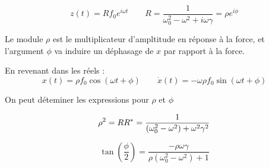 \begin{equation}
    z(t) = R f_0 e^{i \omega t} \qquad R = \frac{1}{\omega_0^2 - \omega^2 + i\omega\gamma} = \rho e^{i\phi}
\end{equation}

Le module $\rho$ est le multiplicateur d’ampltitude en réponse à la force, et l’argument $\phi$ va induire un déphasage de $x$ par rapport à la force.

En revenant dans les réels :
\begin{equation}
    x(t) = \rho f_0 \cos(\omega t + \phi)
    \qquad \dot{x}(t) = -\omega \rho f_0 \sin(\omega t + \phi)
\end{equation}

On peut déteminer les expressions pour $\rho$ et $\phi$

\begin{dmath}
    \rho^2 = RR^* \\
    = \frac{1}{(\omega_0^2 - \omega^2) + \omega^2\gamma^2}
\end{dmath}

\begin{dmath}
    \tan(\frac{\phi}{2}) = \frac{-\rho\omega\gamma}{\rho(\omega_0^2 - \omega^2) + 1}
\end{dmath}

